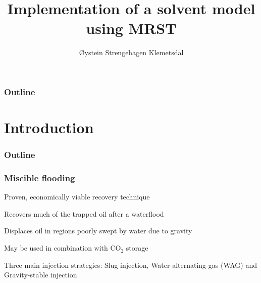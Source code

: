 \documentclass[screen, aspectratio=43]{beamer}
\title[Short title]{Implementation of a solvent model using MRST}
\author[Ø.S. Klemetsdal]{Øystein Strengehagen Klemetsdal}
\institute[NTNU]{Department of Mathematical sciences, NTNU}
\date{} %
\newcommand{\myitemmark}{\raisebox{.75ex}{\scalebox{.6}{\protect\colorbox{ntnublue}{\protect}}}}
\newenvironment{prettyList}
{
  \begin{list}{\myitemmark}{\leftmargin=1.5em \itemindent=0em} 
}
{
  \end{list}
}
\begin{document}
\ntnutitlepage

\begin{frame}
  \frametitle{Outline}
  \tableofcontents
\end{frame}

\section{Introduction}

\begin{frame}
  \frametitle{Outline}
  \tableofcontents[currentsection]
\end{frame}


\begin{frame}
  \frametitle{Miscible flooding}
  Proven, economically viable recovery technique \cite{petroWiki2017Misc}
  \begin{prettyList}
  \item Recovers much of the trapped oil after a waterflood
  \item Displaces oil in regions poorly swept by water due to gravity
  \item May be used in combination with CO$_2$ storage
  \item Three main injection strategies: Slug injection, Water-alternating-gas (WAG) and
    Gravity-stable injection
  \end{prettyList}
  \begin{figure}[h]
    \centering
    \hspace{1em}
  \end{figure}
\end{frame}
\end{document}
